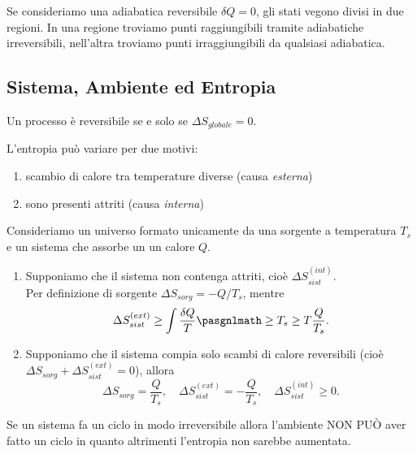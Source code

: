 \begin{remark}
Se consideriamo una adiabatica reversibile $\delta Q=0$, gli stati vegono divisi in due regioni. In una regione troviamo punti raggiungibili tramite adiabatiche irreversibili, nell'altra troviamo punti irraggiungibili da qualsiasi adiabatica.
\end{remark}


\subsection{Sistema, Ambiente ed Entropia}

\begin{remark}
Un processo \`e reversibile se e solo se $\Delta S_{globale}=0$.
\end{remark}

\noindent
L'entropia pu\`o variare per due motivi: 
\begin{enumerate}
\item scambio di calore tra temperature diverse (causa \textit{esterna})
\item sono presenti attriti (causa \textit{interna})
\end{enumerate}

\begin{example}
Consideriamo un universo formato unicamente da una sorgente a temperatura $T_s$ e un sistema che assorbe un un calore $Q$.
\begin{enumerate}
\item Supponiamo che il sistema non contenga attriti, cio\`e $\Delta S_{sist}^{(int)}$.\\ 
Per definizione di sorgente $\Delta S_{sorg}=-Q/T_s$, mentre
\[\Delta S_{sist}^{(ext)}\geq \int \frac{\delta Q}T\pasgnlmath\geq{T_s\geq T} \frac Q{T_s}.\]
\item Supponiamo che il sistema compia solo scambi di calore reversibili (cio\`e $\Delta S_{sorg}+\Delta S_{sist}^{(ext)}=0$), allora
\[\Delta S_{sorg}=\frac Q{T_s},\quad \Delta S_{sist}^{(ext)}=-\frac Q{T_s},\quad \Delta S_{sist}^{(int)}\geq 0.\]
\end{enumerate}
\end{example}


\begin{remark}
Se un sistema fa un ciclo in modo irreversibile allora l'ambiente NON PU\`O aver fatto un ciclo in quanto altrimenti l'entropia non sarebbe aumentata.
\end{remark}

